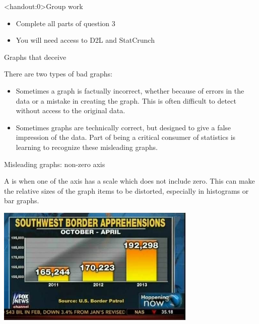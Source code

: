 \documentclass{beamer}
\begin{document}
\begin{frame}<handout:0>{Group work}
\begin{block}{}
\large
\begin{itemize}
\item Complete all parts of question 3
\item You will need access to D2L and StatCrunch
\end{itemize}
\end{block}
\end{frame}


\begin{frame}{Graphs that deceive}
\begin{block}{}
There are two types of bad graphs:
\begin{itemize}
\item Sometimes a graph is factually incorrect, whether because of errors in the data or a mistake in creating the graph. This is often difficult to detect without access to the original data.
\item Sometimes graphs are technically correct, but designed to give a false impression of the data. Part of being a critical consumer of statistics is learning to recognize these misleading graphs.
\end{itemize}
\end{block}
\end{frame}

\begin{frame}{Misleading graphs: non-zero axis}
\begin{block}{}
A  is when one of the axis has a scale which does not include zero. This can make the relative sizes of the graph items to be distorted, especially in histograms or bar graphs.
\end{block}
\pause
\begin{center}
\includegraphics[width=3.75in]{../images/ch02_bad_nonzero}\par
\end{center}
\end{frame}
\end{document}
